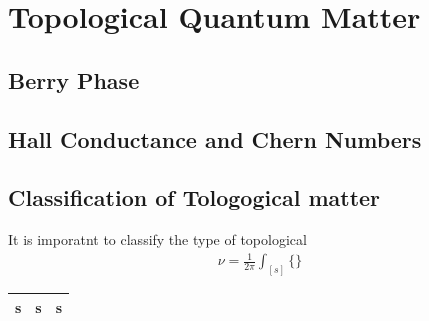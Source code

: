 \chapter{Topological Quantum Matter}   

\section{Berry Phase}



\section{Hall Conductance and Chern Numbers}

\section{Classification of Tologogical matter}

It is imporatnt to classify the type of topological 
\begin{align*}
    \nu = \frac{1}{2 \pi} \int_{[s]} \{  \}
\end{align*}

\begin{table}
    \centering
    \begin{tabular}{c|c|c}
    \hline
    s & s & s\\
    \hline
    \end{tabular}
\end{table}

